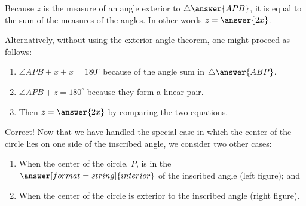 \documentclass[handout,nooutcomes]{ximera}
\begin{document}
\begin{problem}
Because $z$ is the measure of an angle exterior to $\triangle \answer{APB}$, it is equal to the sum of the measures of the  angles.  In other words $z=\answer{2x}$.  

Alternatively, without using the exterior angle theorem, one might proceed as follows:
\begin{enumerate}
\item $\angle APB + x + x = 180^\circ$ because of the angle sum in $\triangle \answer{ABP}$.
\item $\angle APB + z = 180^\circ$ because they form a linear pair. 
\item Then $z = \answer{2x}$ by comparing the two equations. 
\end{enumerate}


\begin{problem}

Correct!   Now that we have handled the special case in which the center of the circle lies on one side of the inscribed angle, we consider two other cases:  
\begin{enumerate}
\item When the center of the circle, $P$, is in the $\answer[format=string]{interior}$ of the inscribed angle (left figure); and 
\item When the center of the circle is exterior to the inscribed angle (right figure).  
\end{enumerate}


\end{problem}
\end{problem}
\end{document}
